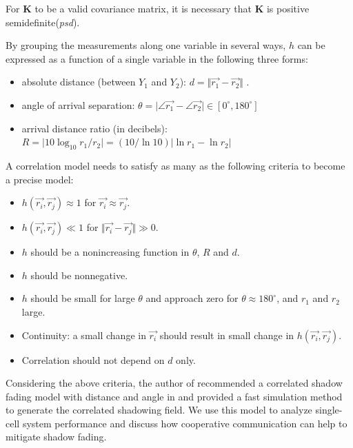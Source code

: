 For $\mathbf{K}$ to be a valid covariance matrix, it is necessary that $\mathbf{K}$ is positive semidefinite(\emph{psd}).
\par By grouping the measurements along one variable in several ways, $h$ can be expressed as a function of a single variable in the following three forms:
\begin{itemize}
\item absolute distance (between $Y_{1}$ and $Y_{2}$): $d = \Vert \vec{r_{1}}- \vec{r_{2}}\Vert$ .
\item angle of arrival separation: $\theta = \vert\angle\vec{r_{1}}-\angle\vec{r_{2}}\vert\in [0^\circ, 180^\circ]$ 
\item arrival distance ratio (in decibels): $R=\vert10\log_{10}r_{1}/r_{2}\vert=(10/\ln 10)\vert \ln r_{1}-\ln r_{2}\vert$
\end{itemize}
A correlation model needs to satisfy as many as the following criteria to become a precise model:
\begin{itemize}
\item $h(\vec{r_{i}}, \vec{r_{j}}) \approx 1$ for $\vec{r_{i}}\approx \vec{r_{j}}$.
\item $h(\vec{r_{i}}, \vec{r_{j}}) \ll 1$ for $\Vert \vec{r_{i}}- \vec{r_{j}}\Vert\gg0$.
\item $h$ should be a nonincreasing function in $\theta$, $R$ and $d$.
\item $h$ should be nonnegative.
\item $h$ should be small for large $\theta$ and approach zero for $\theta\approx180^\circ$, and $r_{1}$ and $r_{2}$ large.
\item Continuity: a small change in $\vec{r_{i}}$ should result in small change in $h(\vec{r_{i}}, \vec{r_{j}})$.
\item Correlation should not depend on $d$ only.
\end{itemize}
Considering the above criteria, the author of \cite{szyszkowicz2010feasibility} recommended a correlated shadow fading model with distance and angle in \cite{szyszkowicz2011interference} and provided a fast simulation method to generate the correlated shadowing field. We use this model to analyze single-cell system performance and discuss how cooperative communication can help to mitigate shadow fading. 
